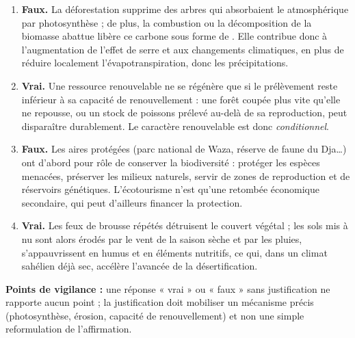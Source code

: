 \documentclass[11pt]{article}
\newcommand{\cle}[1]{{\popxbold\color{popdark}#1}}
\begin{document}
\begin{corrige}
\begin{enumerate}
\item \textbf{Faux.} La déforestation supprime des arbres qui absorbaient le  atmosphérique par photosynthèse ; de plus, la combustion ou la décomposition de la biomasse abattue libère ce carbone sous forme de . Elle contribue donc à l'augmentation de l'effet de serre et aux changements climatiques, en plus de réduire localement l'évapotranspiration, donc les précipitations.
\item \textbf{Vrai.} Une ressource renouvelable ne se régénère que si le prélèvement reste inférieur à sa capacité de renouvellement : une forêt coupée plus vite qu'elle ne repousse, ou un stock de poissons prélevé au-delà de sa reproduction, peut disparaître durablement. Le caractère renouvelable est donc \emph{conditionnel}.
\item \textbf{Faux.} Les aires protégées (parc national de Waza, réserve de faune du Dja\ldots) ont d'abord pour rôle de \cle{conserver la biodiversité} : protéger les espèces menacées, préserver les milieux naturels, servir de zones de reproduction et de réservoirs génétiques. L'écotourisme n'est qu'une retombée économique secondaire, qui peut d'ailleurs financer la protection.
\item \textbf{Vrai.} Les feux de brousse répétés détruisent le couvert végétal ; les sols mis à nu sont alors érodés par le vent de la saison sèche et par les pluies, s'appauvrissent en humus et en éléments nutritifs, ce qui, dans un climat sahélien déjà sec, accélère l'avancée de la désertification.
\end{enumerate}
\textbf{Points de vigilance :} une réponse « vrai » ou « faux » sans justification ne rapporte aucun point ; la justification doit mobiliser un mécanisme précis (photosynthèse, érosion, capacité de renouvellement) et non une simple reformulation de l'affirmation.
\end{corrige}
\end{document}
